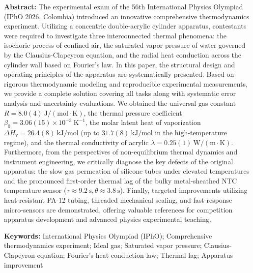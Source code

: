 \documentclass[10pt, a4paper]{ctexart}
\begin{document}
\vspace{0.2cm}
\noindent \textbf{Abstract:} The experimental exam of the 56th International Physics Olympiad (IPhO 2026, Colombia) introduced an innovative comprehensive thermodynamics experiment. Utilizing a concentric double-acrylic cylinder apparatus, contestants were required to investigate three interconnected thermal phenomena: the isochoric process of confined air, the saturated vapor pressure of water governed by the Clausius-Clapeyron equation, and the radial heat conduction across the cylinder wall based on Fourier's law. In this paper, the structural design and operating principles of the apparatus are systematically presented. Based on rigorous thermodynamic modeling and reproducible experimental measurements, we provide a complete solution covering all tasks along with systematic error analysis and uncertainty evaluations. We obtained the universal gas constant $R = 8.0(4)\ \mathrm{J/(mol\cdot K)}$, the thermal pressure coefficient $\beta_0 = 3.06(15)\times 10^{-3}\ \mathrm{K^{-1}}$, the molar latent heat of vaporization $\Delta H_{\mathrm{v}} = 26.4(8)\ \mathrm{kJ/mol}$ (up to $31.7(8)\ \mathrm{kJ/mol}$ in the high-temperature regime), and the thermal conductivity of acrylic $\lambda = 0.25(1)\ \mathrm{W/(m\cdot K)}$. Furthermore, from the perspectives of non-equilibrium thermal dynamics and instrument engineering, we critically diagnose the key defects of the original apparatus: the slow gas permeation of silicone tubes under elevated temperatures and the pronounced first-order thermal lag of the bulky metal-sheathed NTC temperature sensor ($\tau \approx 9.2\ \mathrm{s}, \theta \approx 3.8\ \mathrm{s}$). Finally, targeted improvements utilizing heat-resistant PA-12 tubing, threaded mechanical sealing, and fast-response micro-sensors are demonstrated, offering valuable references for competition apparatus development and advanced physics experimental teaching.

\noindent \textbf{Keywords:} International Physics Olympiad (IPhO); Comprehensive thermodynamics experiment; Ideal gas; Saturated vapor pressure; Clausius-Clapeyron equation; Fourier's heat conduction law; Thermal lag; Apparatus improvement

\vspace{0.3cm}
\end{document}
